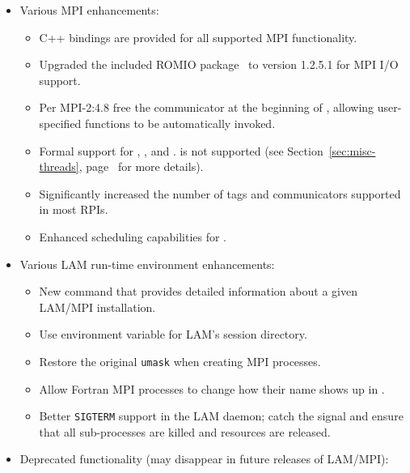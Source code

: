\begin{itemize}
\item Various MPI enhancements:

  \begin{itemize}
  \item C++ bindings are provided for all supported MPI functionality.
    
  \item Upgraded the included ROMIO package~\cite{thak99a,thak99b} to
    version 1.2.5.1 for MPI I/O support.
    
  \item Per MPI-2:4.8 free the 
    communicator at the beginning of ,
    allowing user-specified functions to be automatically invoked.
  
  \item Formal support for ,
    , and
    .
     is not supported (see
    Section~\ref{sec:misc-threads}, page~\pageref{sec:misc-threads}
    for more details).
    
  \item Significantly increased the number of tags and communicators
    supported in most RPIs.
    
  \item Enhanced scheduling capabilities for
    .
  \end{itemize}
  
\item Various LAM run-time environment enhancements:

  \begin{itemize}
  \item New  command that provides detailed information
    about a given LAM/MPI installation.
  \item Use  environment variable for LAM's session
    directory.
  \item Restore the original {\tt umask} when creating MPI processes.
  \item Allow Fortran MPI processes to change how their name shows up
    in .
  \item Better {\tt SIGTERM} support in the LAM daemon; catch the
    signal and ensure that all sub-processes are killed and resources
    are released.
  \end{itemize}
  
\item Deprecated functionality (may disappear in future releases of
  LAM/MPI):


\end{itemize}
